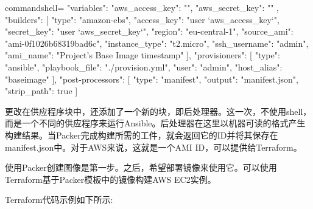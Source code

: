\begin{tcblisting}{commandshell={}}
{
  "variables": {
    "aws_access_key": "",
    "aws_secret_key": ""
  },
  "builders": [{
    "type": "amazon-ebs",
    "access_key": "{{user `aws_access_key`}}",
    "secret_key": "{{user `aws_secret_key`}}",
    "region": "eu-central-1",
    "source_ami": "ami-0f1026b68319bad6c",
    "instance_type": "t2.micro",
    "ssh_username": "admin",
    "ami_name": "Project's Base Image {{timestamp}}"
  }],
  "provisioners": [{
    "type": "ansible",
    "playbook_file": "./provision.yml",
    "user": "admin",
    "host_alias": "baseimage"
  }],
  "post-processors": [{
    "type": "manifest",
    "output": "manifest.json",
    "strip_path": true
  }]
}
\end{tcblisting}

更改在供应程序块中，还添加了一个新的块，即后处理器。这一次，不使用shell，而是一个不同的供应程序来运行Ansible。后处理器在这里以机器可读的格式产生构建结果。当Packer完成构建所需的工件，就会返回它的ID并将其保存在manifest.json中。对于AWS来说，这就是一个AMI ID，可以提供给Terraform。


使用Packer创建图像是第一步。之后，希望部署镜像来使用它。可以使用Terraform基于Packer模板中的镜像构建AWS EC2实例。

Terraform代码示例如下所示:


